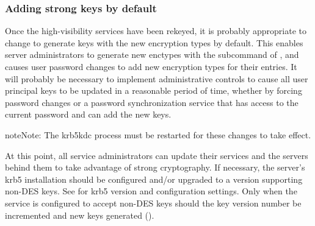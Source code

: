 \documentclass[letterpaper,10pt,english]{sphinxmanual}
\begin{document}
\subsubsection{Adding strong keys by default}
\label{\detokenize{admin/advanced/retiring-des:adding-strong-keys-by-default}}
Once the high-visibility services have been rekeyed, it is probably
appropriate to change {\hyperref[\detokenize{admin/conf_files/kdc_conf:kdc-conf-5}]{}} to generate keys with the new
encryption types by default.  This enables server administrators to generate
new enctypes with the  subcommand of {\hyperref[\detokenize{admin/admin_commands/k5srvutil:k5srvutil-1}]{}},
and causes user password
changes to add new encryption types for their entries.  It will probably
be necessary to implement administrative controls to cause all user
principal keys to be updated in a reasonable period of time, whether
by forcing password changes or a password synchronization service that
has access to the current password and can add the new keys.

%
\begin{sphinxVerbatim}[commandchars=\\\{\}]
\PYG{p}{[}\PYG{p}{]}
          
                      
\end{sphinxVerbatim}

\begin{sphinxadmonition}{note}{Note:}
The krb5kdc process must be restarted for these changes to take effect.
\end{sphinxadmonition}

At this point, all service administrators can update their services and the
servers behind them to take advantage of strong cryptography.
If necessary, the server’s krb5 installation should be configured and/or
upgraded to a version supporting non-DES keys.  See {\hyperref[\detokenize{admin/enctypes:enctypes}]{}} for
krb5 version and configuration settings.
Only when the service is configured to accept non-DES keys should
the key version number be incremented and new keys generated
().
\end{document}
